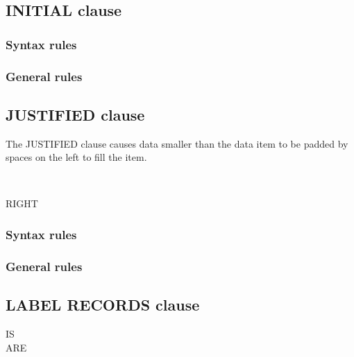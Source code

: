\subsection{INITIAL clause}

\begin{syntax}
\end{syntax}

\subsubsection{Syntax rules}

\subsubsection{General rules}

\subsection{JUSTIFIED clause}

The JUSTIFIED clause causes data smaller than the data item to be padded by spaces on the left to fill the item.

\begin{syntax}
  \begin{1=}
     \\
  \end{1=}
  RIGHT
\end{syntax}

\subsubsection{Syntax rules}

\subsubsection{General rules}

\subsection{LABEL RECORDS clause}

\begin{syntax}[\deletedcolour]
  \begin{1=}
     IS \\
     ARE
  \end{1=}
  \begin{1=}
     \\
  \end{1=}
\end{syntax}

